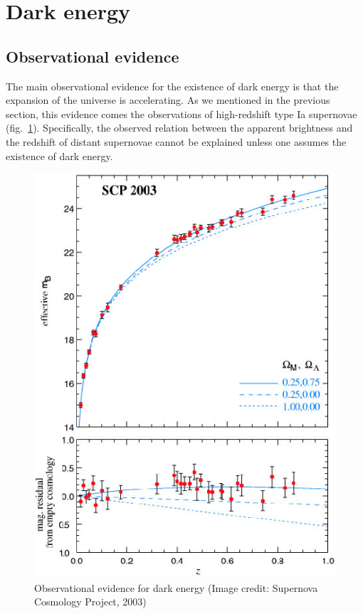 \section{Dark energy}

\subsection{Observational evidence}

The main observational evidence for the existence of dark energy is that the expansion of the universe is accelerating. As we mentioned in the previous section, this evidence comes the observations of high-redshift type Ia supernovae (fig.\ \ref{fig:lec10_7}). Specifically, the observed relation between the apparent brightness and the redshift of distant supernovae cannot be explained unless one assumes the existence of dark energy.
\begin{figure}[ht]
\begin{center}
\includegraphics[scale=0.5]{Draw/lec10_7.png}
\end{center}
\caption{Observational evidence for dark energy (Image credit: Supernova Cosmology Project, 2003)}
\label{fig:lec10_7}
\end{figure}

